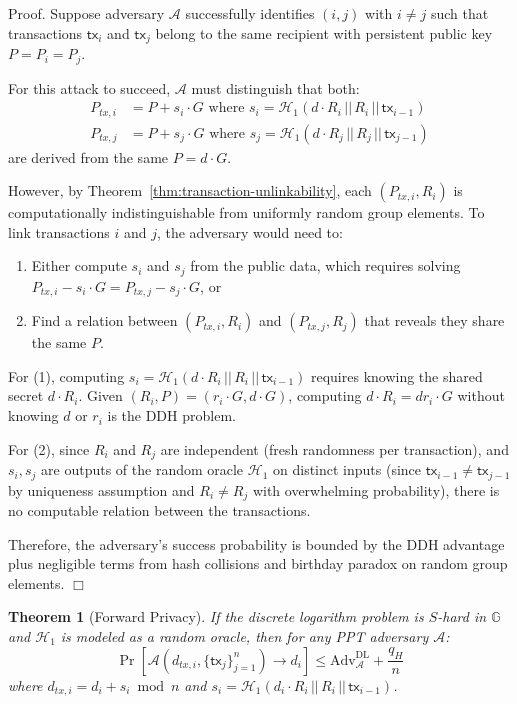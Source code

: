 \documentclass{article}
\newtheorem{theorem}{Theorem}[section]
\newenvironment{proof}{\textsf{Proof}.}{\hfill$\Box$}
\begin{document}
\begin{proof}
Suppose adversary $\mathcal{A}$ successfully identifies $(i,j)$ with $i \neq j$ such that transactions $\mathsf{tx}_i$ and $\mathsf{tx}_j$ belong to the same recipient with persistent public key $P = P_i = P_j$.

For this attack to succeed, $\mathcal{A}$ must distinguish that both:
\begin{align*}
P_{tx,i} &= P + s_i \cdot G \text{ where } s_i = \mathcal{H}_1(d \cdot R_i \,||\, R_i \,||\, \mathsf{tx}_{i-1}) \\
P_{tx,j} &= P + s_j \cdot G \text{ where } s_j = \mathcal{H}_1(d \cdot R_j \,||\, R_j \,||\, \mathsf{tx}_{j-1})
\end{align*}
are derived from the same $P = d \cdot G$.

However, by Theorem~\ref{thm:transaction-unlinkability}, each $(P_{tx,i}, R_i)$ is computationally indistinguishable from uniformly random group elements. To link transactions $i$ and $j$, the adversary would need to:

\begin{enumerate}
\item Either compute $s_i$ and $s_j$ from the public data, which requires solving $P_{tx,i} - s_i \cdot G = P_{tx,j} - s_j \cdot G$, or
\item Find a relation between $(P_{tx,i}, R_i)$ and $(P_{tx,j}, R_j)$ that reveals they share the same $P$.
\end{enumerate}

For (1), computing $s_i = \mathcal{H}_1(d \cdot R_i \,||\, R_i \,||\, \mathsf{tx}_{i-1})$ requires knowing the shared secret $d \cdot R_i$. Given $(R_i, P) = (r_i \cdot G, d \cdot G)$, computing $d \cdot R_i = dr_i \cdot G$ without knowing $d$ or $r_i$ is the DDH problem.

For (2), since $R_i$ and $R_j$ are independent (fresh randomness per transaction), and $s_i, s_j$ are outputs of the random oracle $\mathcal{H}_1$ on distinct inputs (since $\mathsf{tx}_{i-1} \neq \mathsf{tx}_{j-1}$ by uniqueness assumption and $R_i \neq R_j$ with overwhelming probability), there is no computable relation between the transactions.

Therefore, the adversary's success probability is bounded by the DDH advantage plus negligible terms from hash collisions and birthday paradox on random group elements.
\end{proof}

\begin{theorem}[Forward Privacy]
\label{thm:forward-privacy}
If the discrete logarithm problem is $S$-hard in $\mathbb{G}$ and $\mathcal{H}_1$ is modeled as a random oracle, then for any PPT adversary $\mathcal{A}$:
$$\Pr\left[\mathcal{A}(d_{tx,i}, \{\mathsf{tx}_j\}_{j=1}^n) \rightarrow d_i\right] \leq \text{Adv}^{\text{DL}}_{\mathcal{A}} + \frac{q_H}{n}$$
where $d_{tx,i} = d_i + s_i \bmod n$ and $s_i = \mathcal{H}_1(d_i \cdot R_i \,||\, R_i \,||\, \mathsf{tx}_{i-1})$.
\end{theorem}
\end{document}
